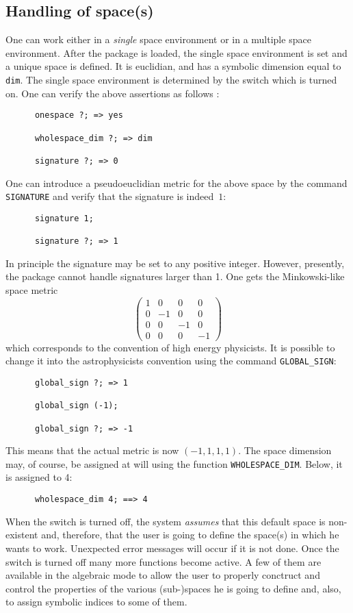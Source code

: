 \subsection{Handling of space(s)}
\hypertarget{switch:ONESPACE}{}
One can work either in a \emph{single} space environment or in
a multiple space environment. After the package is loaded,
the single space environment is set and
a unique space is defined. It is euclidian, and has a symbolic
dimension equal to \texttt{dim}.
The single space environment is determined by the switch
 which is turned on.
One can verify the above assertions as follows :
\begin{verbatim}
      onespace ?; => yes

      wholespace_dim ?; => dim

      signature ?; => 0
\end{verbatim}
One can introduce a pseudoeuclidian metric for the above space by the
command \texttt{SIGNATURE} and
verify that the signature is indeed~$1$:
\begin{verbatim}
      signature 1;

      signature ?; => 1
\end{verbatim}
In principle the signature may be set to any positive
integer. However, presently,
the package cannot handle signatures larger than 1.
One gets the Minkowski-like space metric
\[
\left(\begin{array}{cccc}
	1 & 0 & 0 & 0  \\
	0 & -1 & 0 & 0  \\
        0 & 0 & -1 & 0 \\
        0 & 0 & 0 & -1
 \end{array}
\right)
\]
which corresponds to the convention of high energy physicists.
It is possible to change it into the  astrophysicists convention using
the command  \texttt{GLOBAL\_SIGN}:
\begin{verbatim}
      global_sign ?; => 1

      global_sign (-1);

      global_sign ?; => -1
\end{verbatim}
This means that the actual metric is now  $(-1,1,1,1)$.
The space dimension may, of course, be assigned at will using the function
\texttt{WHOLESPACE\_DIM}. Below, it is assigned to 4:
\begin{verbatim}
      wholespace_dim 4; ==> 4
\end{verbatim}
When the switch  is turned off, the system \emph{assumes} that this default
space is non-existent and, therefore, that the user is going to define the
space(s) in which he wants to work.
Unexpected error messages will occur if it is not done.
Once the switch is turned off many more functions become active. A few of them are
available in the algebraic mode to allow the user to properly conctruct
and control the properties of the various (sub-)spaces he is going to define
and, also, to assign symbolic indices to some of them.

